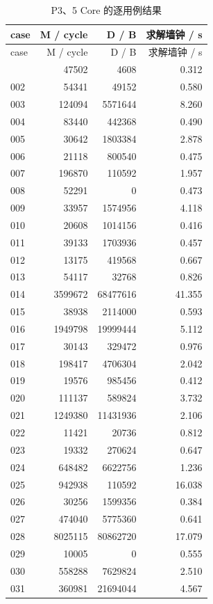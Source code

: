 \documentclass[anonymous,notoc]{gmcm2026}
\begin{document}
\begin{longtable}{lrrr}
\caption{P3、5 Core 的逐用例结果}\\
\toprule
case & M / cycle & D / B & 求解墙钟 / s\\\midrule
\endfirsthead
\toprule
case & M / cycle & D / B & 求解墙钟 / s\\\midrule
\endhead
\bottomrule\endfoot
001 & 47502 & 4608 & 0.312 \\
002 & 54341 & 49152 & 0.580 \\
003 & 124094 & 5571644 & 8.260 \\
004 & 83440 & 442368 & 0.490 \\
005 & 30642 & 1803384 & 2.878 \\
006 & 21118 & 800540 & 0.475 \\
007 & 196870 & 110592 & 1.957 \\
008 & 52291 & 0 & 0.473 \\
009 & 33957 & 1574956 & 4.118 \\
010 & 20608 & 1014156 & 0.416 \\
011 & 39133 & 1703936 & 0.457 \\
012 & 13175 & 419568 & 0.667 \\
013 & 54117 & 32768 & 0.826 \\
014 & 3599672 & 68477616 & 41.355 \\
015 & 38938 & 2114000 & 0.593 \\
016 & 1949798 & 19999444 & 5.112 \\
017 & 30143 & 329472 & 0.976 \\
018 & 198417 & 4706304 & 2.042 \\
019 & 19576 & 985456 & 0.412 \\
020 & 111137 & 589824 & 3.732 \\
021 & 1249380 & 11431936 & 2.106 \\
022 & 11421 & 20736 & 0.812 \\
023 & 19332 & 270624 & 0.647 \\
024 & 648482 & 6622756 & 1.236 \\
025 & 942938 & 110592 & 16.038 \\
026 & 30256 & 1599356 & 0.384 \\
027 & 474040 & 5775360 & 0.641 \\
028 & 8025115 & 80862720 & 17.079 \\
029 & 10005 & 0 & 0.555 \\
030 & 558288 & 7629824 & 2.510 \\
031 & 360981 & 21694044 & 4.567 \\

\end{longtable}
\end{document}
